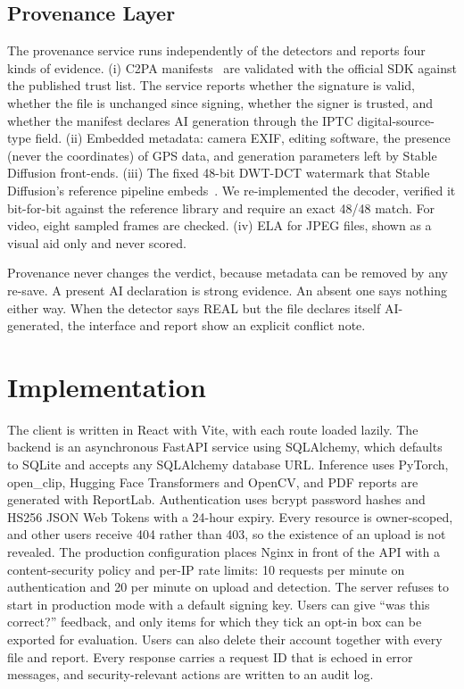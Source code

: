 \documentclass[conference]{IEEEtran}
\begin{document}
\subsection{Provenance Layer}
The provenance service runs independently of the detectors and reports four kinds of evidence. (i) C2PA manifests~\cite{c2pa} are validated with the official SDK against the published trust list. The service reports whether the signature is valid, whether the file is unchanged since signing, whether the signer is trusted, and whether the manifest declares AI generation through the IPTC digital-source-type field. (ii) Embedded metadata: camera EXIF, editing software, the presence (never the coordinates) of GPS data, and generation parameters left by Stable Diffusion front-ends. (iii) The fixed 48-bit DWT-DCT watermark that Stable Diffusion's reference pipeline embeds~\cite{invisiblewm}. We re-implemented the decoder, verified it bit-for-bit against the reference library and require an exact 48/48 match. For video, eight sampled frames are checked. (iv) ELA for JPEG files, shown as a visual aid only and never scored.

Provenance never changes the verdict, because metadata can be removed by any re-save. A present AI declaration is strong evidence. An absent one says nothing either way. When the detector says REAL but the file declares itself AI-generated, the interface and report show an explicit conflict note.


\section{Implementation}
The client is written in React with Vite, with each route loaded lazily. The backend is an asynchronous FastAPI service using SQLAlchemy, which defaults to SQLite and accepts any SQLAlchemy database URL. Inference uses PyTorch, open\_clip, Hugging Face Transformers and OpenCV, and PDF reports are generated with ReportLab. Authentication uses bcrypt password hashes and HS256 JSON Web Tokens with a 24-hour expiry. Every resource is owner-scoped, and other users receive 404 rather than 403, so the existence of an upload is not revealed. The production configuration places Nginx in front of the API with a content-security policy and per-IP rate limits: 10 requests per minute on authentication and 20 per minute on upload and detection. The server refuses to start in production mode with a default signing key. Users can give ``was this correct?'' feedback, and only items for which they tick an opt-in box can be exported for evaluation. Users can also delete their account together with every file and report. Every response carries a request ID that is echoed in error messages, and security-relevant actions are written to an audit log.
\end{document}

